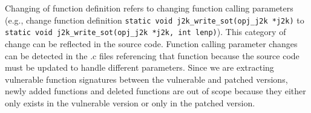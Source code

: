 Changing of function definition refers to changing function calling parameters (e.g., change function definition \texttt{static void j2k\_write\_sot(opj\_j2k *j2k)} to \texttt{static void j2k\_write\_sot(opj\_j2k *j2k, int lenp)}).
This category of change can be reflected in the source code. 
Function calling parameter changes can be detected in the .c files referencing that function because the source code must be updated to handle different parameters. 
Since we are extracting vulnerable function signatures between the vulnerable and patched versions, newly added functions and deleted functions are out of scope because they either only exists in the vulnerable version or only in the patched version. 

